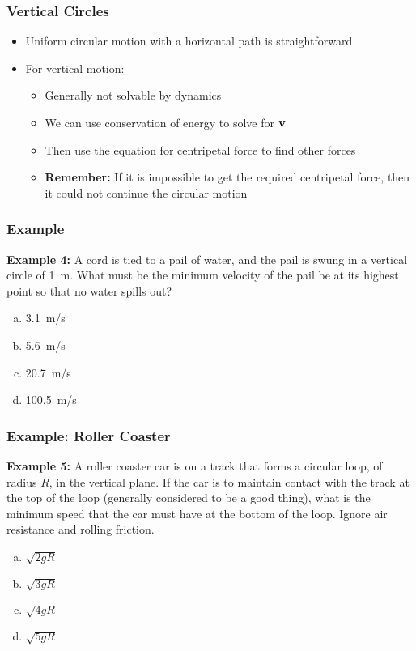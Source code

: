 \documentclass[12pt,compress,aspectratio=169]{beamer}
\newcommand{\mb}[1]{\ensuremath\mathbf{#1}}
\begin{document}
\begin{frame}
  \frametitle{Vertical Circles}
  \begin{itemize}
  \item Uniform circular motion with a horizontal path is straightforward
  \item For vertical motion:
    \begin{itemize}
    \item Generally not solvable by dynamics
    \item We can use conservation of energy to solve for $\mb{v}$
    \item Then use the equation for centripetal force to find other forces
    \item\textbf{Remember: } If it is impossible to get the required
      centripetal force, then it could not continue the circular motion
    \end{itemize}
  \end{itemize}
\end{frame}


\begin{frame}
  \frametitle{Example}
  \textbf{Example 4:} A cord is tied to a pail of water, and the pail is swung
  in a vertical circle of \SI{1}{\metre}. What must be the minimum velocity of
  the pail be at its highest point so that no water spills out?

  \begin{enumerate}[(a)]
  \item\SI{3.1}{m/\s}
  \item\SI{5.6}{m/\s}
  \item\SI{20.7}{m/\s}
  \item\SI{100.5}{m/\s}
  \end{enumerate}
\end{frame}


\begin{frame}
  \frametitle{Example: Roller Coaster}
  \textbf{Example 5:} A roller coaster car is on a track that forms a circular
  loop, of radius $R$, in the vertical plane. If the car is to maintain contact
  with the track at the top of the loop (generally considered to be a good
  thing), what is the minimum speed that the car must have at the bottom of the
  loop. Ignore air resistance and rolling friction.

  \begin{enumerate}[(a)]
  \item $\sqrt{2gR}$
  \item $\sqrt{3gR}$
  \item $\sqrt{4gR}$
  \item $\sqrt{5gR}$
  \end{enumerate}
\end{frame}
\end{document}
